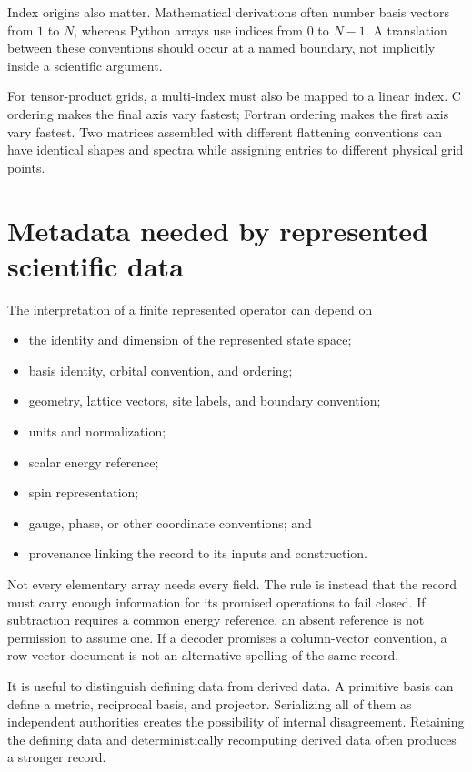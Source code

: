 Index origins also matter. Mathematical derivations often number basis vectors
from \(1\) to \(N\), whereas Python arrays use indices from \(0\) to \(N-1\).
A translation between these conventions should occur at a named boundary, not
implicitly inside a scientific argument.

For tensor-product grids, a multi-index must also be mapped to a linear index.
C ordering makes the final axis vary fastest; Fortran ordering makes the first
axis vary fastest. Two matrices assembled with different flattening conventions
can have identical shapes and spectra while assigning entries to different
physical grid points.

\section{Metadata needed by represented scientific data}

The interpretation of a finite represented operator can depend on

\begin{itemize}
  \item the identity and dimension of the represented state space;
  \item basis identity, orbital convention, and ordering;
  \item geometry, lattice vectors, site labels, and boundary convention;
  \item units and normalization;
  \item scalar energy reference;
  \item spin representation;
  \item gauge, phase, or other coordinate conventions; and
  \item provenance linking the record to its inputs and construction.
\end{itemize}

Not every elementary array needs every field. The rule is instead that the
record must carry enough information for its promised operations to fail closed.
If subtraction requires a common energy reference, an absent reference is not
permission to assume one. If a decoder promises a column-vector convention, a
row-vector document is not an alternative spelling of the same record.

It is useful to distinguish defining data from derived data. A primitive basis
can define a metric, reciprocal basis, and projector. Serializing all of them as
independent authorities creates the possibility of internal disagreement.
Retaining the defining data and deterministically recomputing derived data often
produces a stronger record.

